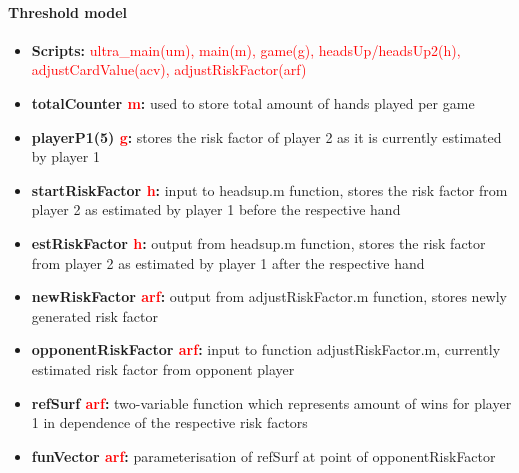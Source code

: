 \documentclass[11pt]{article}
\begin{document}
\paragraph{Threshold model}
\begin{itemize}
\item	\textbf{Scripts:} \textcolor{red}{ultra\_main(um), main(m), game(g), headsUp/headsUp2(h), adjustCardValue(acv), adjustRiskFactor(arf)} \\

\item	\textbf{totalCounter \textcolor{red}{m}:} used to store total amount of hands played per game  \\

\item	\textbf{playerP1(5) \textcolor{red}{g}:} stores the risk factor of player 2 as it is currently estimated by player 1  \\

\item	\textbf{startRiskFactor \textcolor{red}{h}:} input to headsup.m function, stores the risk factor from player 2 as estimated by player 1 before the respective hand  \\

\item	\textbf{estRiskFactor \textcolor{red}{h}:} output from headsup.m function, stores the risk factor from player 2 as estimated by player 1 after the respective hand   \\

\item	\textbf{newRiskFactor \textcolor{red}{arf}:}  output from adjustRiskFactor.m function, stores newly generated risk factor\\

\item	\textbf{opponentRiskFactor \textcolor{red}{arf}:} input to function adjustRiskFactor.m, currently estimated risk factor from opponent player \\

\item	\textbf{refSurf \textcolor{red}{arf}:} two-variable function which represents amount of wins for player 1 in dependence of the respective risk factors \\

\item	\textbf{funVector \textcolor{red}{arf}:} parameterisation of refSurf at point of opponentRiskFactor \\

\end{itemize}
\end{document}
